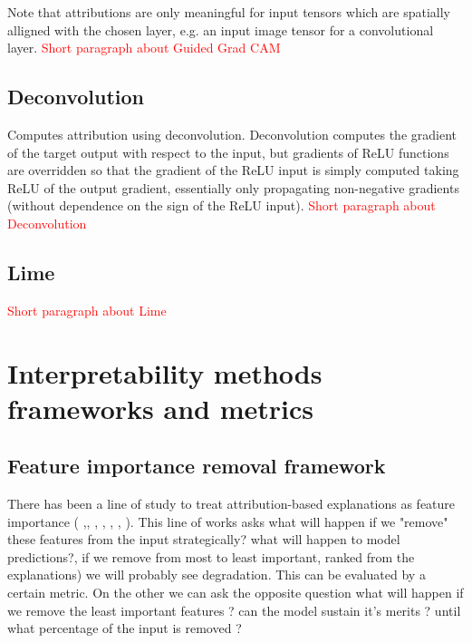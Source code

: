 \documentclass[12pt]{report}
\begin{document}
Note that attributions are only meaningful for input tensors which are spatially alligned with the chosen layer, e.g. an input image tensor for a convolutional layer.
\textcolor{red}{Short paragraph about Guided Grad CAM}\cite{DBLP:journals/corr/SelvarajuDVCPB16}


\subsection{Deconvolution}
Computes attribution using deconvolution. Deconvolution computes the gradient of the target output with respect to the input, but gradients of ReLU functions are overridden so that the gradient of the ReLU input is simply computed taking ReLU of the output gradient, essentially only propagating non-negative gradients (without dependence on the sign of the ReLU input).
\textcolor{red}{Short paragraph about Deconvolution}\cite{DBLP:journals/corr/ZeilerF13} \cite{10.1007/978-3-319-46466-4_8}

\subsection{Lime}
\textcolor{red}{Short paragraph about Lime} \cite{DBLP:journals/corr/RibeiroSG16}



\newpage

\section{Interpretability methods frameworks and metrics}

\subsection{Feature importance removal framework}

There has been a line of study to treat attribution-based explanations as feature importance (\cite{https://doi.org/10.48550/arxiv.1509.06321} \cite{https://doi.org/10.48550/arxiv.1806.10758} \cite{DBLP:journals/corr/MontavonSM17},\cite{LRP},  \cite{DBLP:journals/corr/ArrasHMMS16a}, \cite{DBLP:journals/corr/abs-1911-03429}, \cite{DBLP:journals/corr/abs-1905-04610}, \cite{DBLP:journals/corr/abs-1904-11829}, \cite{nguyen-2018-comparing}).  This line of works asks what will happen if we "remove" these features from the input strategically?  what will happen to model predictions?, if we remove from most to least important, ranked from the explanations) we will probably see degradation. This can be evaluated by a certain metric. On the other we can ask the opposite question what will happen if we remove the least important features ? can the model sustain it's merits ? until what percentage of the input is removed ? \\
\end{document}

